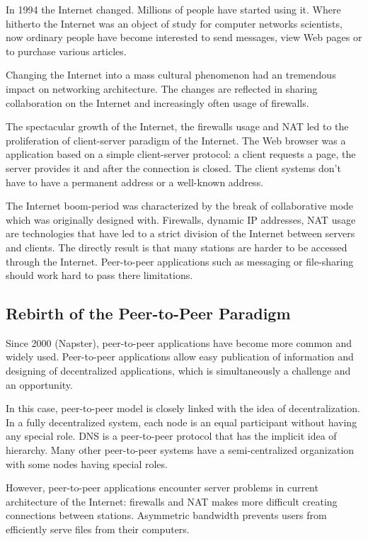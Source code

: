 In 1994 the Internet changed. Millions of people have started using it. Where
hitherto the Internet was an object of study for computer networks scientists,
now ordinary people have become interested to send messages, view Web pages or
to purchase various articles.

Changing the Internet into a mass cultural phenomenon had an tremendous impact
on networking architecture. The changes are reflected in sharing collaboration
on the Internet and increasingly often usage of firewalls.

The spectacular growth of the Internet, the firewalls usage and NAT led to the
proliferation of client-server paradigm of the Internet. The Web browser was a
application based on a simple client-server protocol: a client requests a
page, the server provides it and after the connection is closed. The client
systems don't have to have a permanent address or a well-known address.

The Internet boom-period was characterized by the break of collaborative mode
which was originally designed with. Firewalls, dynamic IP addresses, NAT usage
are technologies that have led to a strict division of the Internet between
servers and clients. The directly result is that many stations are harder
to be accessed through the Internet. Peer-to-peer applications such as
messaging or file-sharing should work hard to pass there limitations.

\subsection{Rebirth of the Peer-to-Peer Paradigm}

Since 2000 (Napster), peer-to-peer applications have become more common and
widely used. Peer-to-peer applications allow easy publication of information
and designing of decentralized applications, which is simultaneously a challenge
and an opportunity.

In this case, peer-to-peer model is closely linked with the idea of
decentralization. In a fully decentralized system, each node is an equal
participant without having any special role. DNS is a peer-to-peer protocol
that has the implicit idea of hierarchy. Many other peer-to-peer systems have
a semi-centralized organization with some nodes having special roles.

However, peer-to-peer applications encounter server problems in current
architecture of the Internet: firewalls and NAT makes more difficult creating
connections between stations. Asymmetric bandwidth prevents users from
efficiently serve files from their computers.

